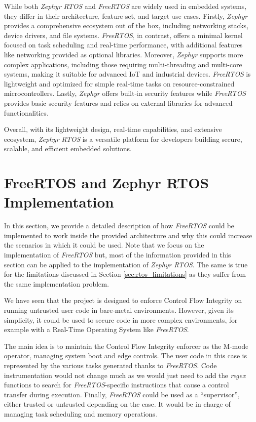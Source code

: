 While both \textit{Zephyr RTOS} and \textit{FreeRTOS} are widely used in embedded
systems, they differ in their architecture, feature set, and target use cases. Firstly,
\textit{Zephyr} provides a comprehensive ecosystem out of the box, including
networking stacks, device drivers, and file systems. \textit{FreeRTOS}, in contrast,
offers a minimal kernel focused on task scheduling and real-time performance, with
additional features like networking provided as optional libraries. Moreover, \textit{Zephyr}
supports more complex applications, including those requiring multi-threading and
multi-core systems, making it suitable for advanced IoT and industrial devices. \textit{FreeRTOS}
is lightweight and optimized for simple real-time tasks on resource-constrained
microcontrollers. Lastly, \textit{Zephyr} offers built-in security features while
\textit{FreeRTOS} provides basic security features and relies on external
libraries for advanced functionalities.

Overall, with its lightweight design, real-time capabilities, and extensive ecosystem,
\textit{Zephyr RTOS} is a versatile platform for developers building secure,
scalable, and efficient embedded solutions.

\section{FreeRTOS and Zephyr RTOS Implementation}
\label{sec:rtos_porting}

In this section, we provide a detailed description of how \textit{FreeRTOS}
could be implemented to work inside the provided architecture and why this could
increase the scenarios in which it could be used. Note that we focus on the implementation
of \textit{FreeRTOS} but, most of the information provided in this section can be
applied to the implementation of \textit{Zephyr RTOS}. The same is true for the limitations
discussed in Section \ref{sec:rtos_limitations} as they suffer from the same implementation
problem.

We have seen that the project is designed to enforce Control Flow Integrity on running
untrusted user code in bare-metal environments. However, given its simplicity,
it could be used to secure code in more complex environments, for example with a
Real-Time Operating System like \textit{FreeRTOS}.

The main idea is to maintain the Control Flow Integrity enforcer as the M-mode
operator, managing system boot and edge controls. The user code in this case is
represented by the various tasks generated thanks to \textit{FreeRTOS}. Code
instrumentation would not change much as we would just need to add the \textit{regex}
functions to search for \textit{FreeRTOS}-specific instructions that cause a
control transfer during execution. Finally, \textit{FreeRTOS} could be used as a
``supervisor'', either trusted or untrusted depending on the case. It would be in
charge of managing task scheduling and memory operations.

